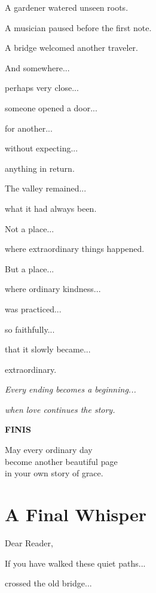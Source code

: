\documentclass[12pt,openany]{book}
\begin{document}
A gardener watered unseen roots.

A musician paused before the first note.

A bridge welcomed another traveler.

And somewhere...

perhaps very close...

someone opened a door...

for another...

without expecting...

anything in return.

The valley remained...

what it had always been.

Not a place...

where extraordinary things happened.

But a place...

where ordinary kindness...

was practiced...

so faithfully...

that it slowly became...

extraordinary.

\begin{center}

\Large\textit{Every ending becomes a beginning...}

\vspace{0.6cm}

\large\textit{when love continues the story.}

\end{center}

\newpage

\begin{center}
{\Huge\textbf{FINIS}}

\vspace{1cm}

\Large
May every ordinary day\\
become another beautiful page\\
in your own story of grace.

\end{center}
\chapter*{A Final Whisper}

Dear Reader,

If you have walked these quiet paths...

crossed the old bridge...
\end{document}
